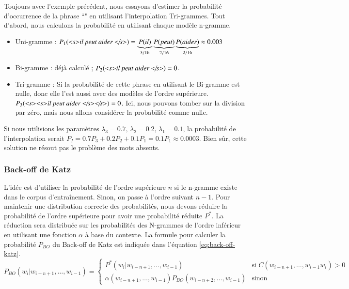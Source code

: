 \documentclass{KodeBook}
\begin{document}
Toujours avec l'exemple précédent, nous essayons d'estimer la probabilité d'occurrence de la phrase ``"
en utilisant l'interpolation Tri-grammes.
Tout d'abord, nous calculons la probabilité en utilisant chaque modèle n-gramme.
\begin{itemize}
	\item Uni-gramme : 
	$P_1(\text{\textit{\textless s\textgreater il peut aider \textless/s\textgreater}}) = 
	\underbrace{P(il)}_{3/16}
	\underbrace{P(peut)}_{2/16} 
	\underbrace{P(aider)}_{2/16} \approx 0.003$
	
	\item Bi-gramme : déjà calculé ; $P_2(\text{\textit{\textless s\textgreater il peut aider \textless/s\textgreater}})=0$.
	
	\item Tri-gramme : Si la probabilité de cette phrase en utilisant le Bi-gramme est nulle, donc elle l'est aussi avec des modèles de l'ordre supérieure. 
	$P_3(\text{\textit{\textless s\textgreater \textless s\textgreater il peut aider \textless/s\textgreater \textless/s\textgreater}})=0$.
	Ici, nous pouvons tomber sur la division par zéro, mais nous allons considérer la probabilité comme nulle.
\end{itemize}
%
Si nous utilisions les paramètres $\lambda_3=0.7,\, \lambda_2=0.2,\, \lambda_1 = 0.1$, la probabilité de l'interpolation serait $P_I = 0.7 P_3 + 0.2 P_2 + 0.1 P_1 = 0.1 P_1 \approx 0.0003$. 
Bien sûr, cette solution ne résout pas le problème des mots absents.

\subsubsection{Back-off de Katz}

L'idée est d'utiliser la probabilité de l'ordre supérieure $n$ si le n-gramme existe dans le corpus d'entraînement. 
Sinon, on passe à l'ordre suivant $n-1$.
Pour maintenir une distribution correcte des probabilités, nous devons réduire la probabilité de l'ordre supérieure pour avoir une probabilité réduite $P^*$. 
La réduction sera distribuée sur les probabilités des N-grammes de l'ordre inférieur en utilisant une fonction $\alpha$ à base du contexte.
La formule pour calculer la probabilité $P_{BO}$ du Back-off de Katz est indiquée dans l'équation \ref{eq:back-off-katz}.
\begin{equation}
	P_{BO}(w_i | w_{i-n+1}, \ldots, w_{i-1}) = 
	\begin{cases}
	P^*(w_i | w_{i-n+1}, \ldots, w_{i-1}) & \text{si } C(w_{i-n+1}, \ldots, w_{i-1} w_i) > 0 \\
	\alpha(w_{i-n+1}, \ldots, w_{i-1}) P_{BO}(w_{i-n+2}, \ldots, w_{i-1}) & \text{sinon}
	\end{cases}
	\label{eq:back-off-katz}
\end{equation}
\end{document}
